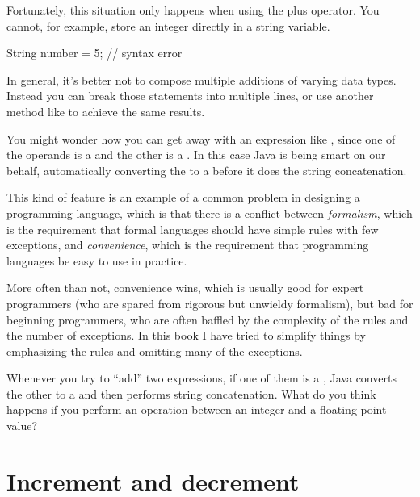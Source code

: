 Fortunately, this situation only happens when using the plus operator.
You cannot, for example, store an integer directly in a string variable.

\begin{code}
     String number = 5;  // syntax error
\end{code}

In general, it's better not to compose multiple additions of varying data types.
Instead you can break those statements into multiple lines, or use another method like  to achieve the same results.



You might wonder how you can get away with an expression like , since one of the operands is a 
and the other is a .  In this case Java is being
smart on our behalf, automatically converting the  to a
 before it does the string concatenation.

This kind of feature is an example of a common problem in designing a
programming language, which is that there is a conflict between {\em
formalism}, which is the requirement that formal languages should have
simple rules with few exceptions, and {\em convenience}, which is the
requirement that programming languages be easy to use in practice.

More often than not, convenience wins, which is usually good for
expert programmers (who are spared from rigorous but unwieldy
formalism), but bad for beginning programmers, who are often baffled
by the complexity of the rules and the number of exceptions.  In this
book I have tried to simplify things by emphasizing the rules and
omitting many of the exceptions.

Whenever you try to ``add'' two
expressions, if one of them is a , Java converts the
other to a  and then performs string concatenation.
What do you think happens if you perform an operation between
an integer and a floating-point value?


\section{Increment and decrement}


